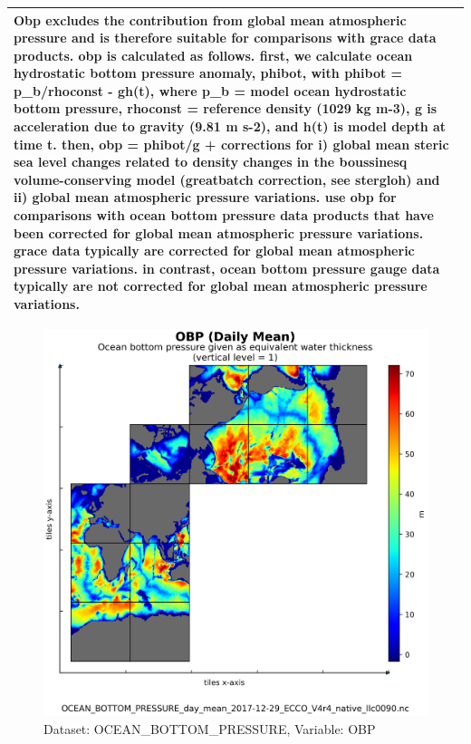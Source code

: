 \begin{longtable}{|m{}|m{}|m{}|m{}|}
\multicolumn{4}{|p{1\textwidth}|}{\footnotesize{{Obp excludes the contribution from global mean atmospheric pressure and is therefore suitable for comparisons with grace data products. obp is calculated as follows. first, we calculate ocean hydrostatic bottom pressure anomaly, phibot, with phibot = p\_b/rhoconst - gh(t), where p\_b = model ocean hydrostatic bottom pressure, rhoconst = reference density (1029 kg m-3), g is acceleration due to gravity (9.81 m s-2), and h(t) is model depth at time t. then, obp = phibot/g + corrections for i) global mean steric sea level changes related to density changes in the boussinesq volume-conserving model (greatbatch correction, see stergloh) and ii) global mean atmospheric pressure variations. use obp for comparisons with ocean bottom pressure data products that have been corrected for global mean atmospheric pressure variations. grace data typically are corrected for global mean atmospheric pressure variations. in contrast, ocean bottom pressure gauge data typically are not corrected for global mean atmospheric pressure variations.}}} \\ \hline
\end{longtable}

\begin{figure}[H]
\centering
\includegraphics[scale=0.55]{../images/plots/native_plots/Ocean_Bottom_Pressure/OBP.png}
\caption{Dataset: OCEAN\_BOTTOM\_PRESSURE, Variable: OBP}
\label{tab:table-OCEAN_BOTTOM_PRESSURE_OBP-Plot}
\end{figure}
\newpage
\pagebreak
